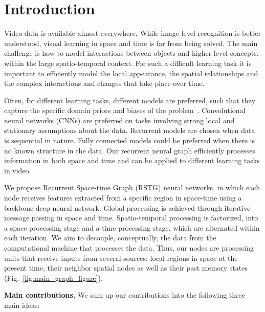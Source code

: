\documentclass{article}
\begin{document}
\section{Introduction}
\label{introduction}
Video data is available almost everywhere. While image level recognition is better understood, visual learning in space and time is far from being solved. The main challenge is how to model interactions between objects and higher level concepts, within the large spatio-temporal context. For such a difficult learning task it is important to efficiently model the local appearance, the spatial relationships and the complex interactions and changes that take place over time.

Often, for different learning tasks, different models are preferred, such that they capture the specific domain priors and biases of the problem~\cite{battaglia2018relational}.  Convolutional neural networks (CNNs) are preferred on tasks involving strong local and stationary assumptions about the data. Recurrent models are chosen when data is sequential in nature. Fully connected models could be preferred when there is no known structure in the data. Our recurrent neural graph efficiently processes information in both space and time and can be applied to different learning tasks in video.



We propose Recurrent Space-time Graph (RSTG) neural networks, in which each node receives features extracted from a specific region in space-time using a backbone deep neural network. Global processing is achieved through iterative message passing in space and time. Spatio-temporal processing is factorized, into a space processing stage and a time processing stage, which are alternated within each iteration. We aim to decouple, conceptually, the data from the computational machine that processes the data. Thus, our nodes are processing units that receive inputs from several sources: local regions in space at the present time, their neighbor spatial nodes as well as their past memory states (Fig.~\ref{fig:main_graph_figure}). 

\noindent \textbf{Main contributions.}
We sum up our contributions into the following three main ideas:
\end{document}
